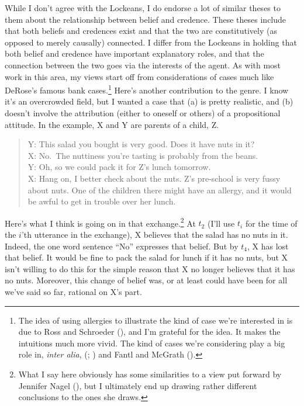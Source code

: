 \documentclass[
  11pt,
  letterpaper,
  DIV=11,
  numbers=noendperiod,
  twoside]{scrartcl}
\begin{document}
While I don't agree with the Lockeans, I do endorse a lot of similar
theses to them about the relationship between belief and credence. These
theses include that both beliefs and credences exist and that the two
are constitutively (as opposed to merely causally) connected. I differ
from the Lockeans in holding that both belief and credence have
important explanatory roles, and that the connection between the two
goes via the interests of the agent. As with most work in this area, my
views start off from considerations of cases much like DeRose's famous
bank cases.\footnote{The idea of using allergies to illustrate the kind
  of case we're interested in is due to Ross and Schroeder
  (), and I'm grateful for the
  idea. It makes the intuitions much more vivid. The kind of cases we're
  considering play a big role in, \emph{inter alia},
  (;
  ) and Fantl and McGrath
  ().} Here's another contribution to the
genre. I know it's an overcrowded field, but I wanted a case that (a) is
pretty realistic, and (b) doesn't involve the attribution (either to
oneself or others) of a propositional attitude. In the example, X and Y
are parents of a child, Z.

\begin{quote}
Y: This salad you bought is very good. Does it have nuts in it?\\
X: No.~The nuttiness you're tasting is probably from the beans.\\
Y: Oh, so we could pack it for Z's lunch tomorrow.\\
X: Hang on, I better check about the nuts. Z's pre-school is very fussy
about nuts. One of the children there might have an allergy, and it
would be awful to get in trouble over her lunch.
\end{quote}

Here's what I think is going on in that exchange.\footnote{What I say
  here obviously has some similarities to a view put forward by Jennifer
  Nagel (), but I ultimately end up
  drawing rather different conclusions to the ones she draws.} At
\(t_2\) (I'll use \(t_i\) for the time of the \(i\)'th utterance in the
exchange), X believes that the salad has no nuts in it. Indeed, the one
word sentence ``No'' expresses that belief. But by \(t_4\), X has lost
that belief. It would be fine to pack the salad for lunch if it has no
nuts, but X isn't willing to do this for the simple reason that X no
longer believes that it has no nuts. Moreover, this change of belief
was, or at least could have been for all we've said so far, rational on
X's part.
\end{document}
